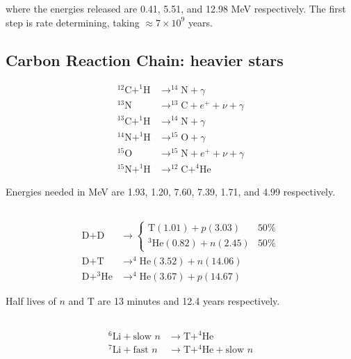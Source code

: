 \documentclass[12pt]{article}
\begin{document}
where the energies released are 0.41, 5.51, and 12.98 MeV respectively. The first step is rate determining, taking $\approx 7 \times 10^9$ years.

\subsection{Carbon Reaction Chain: heavier stars}

\begin{align*}
    ^{12}\text{C} + ^1\text{H} &\rightarrow ^{14}\text{N} + \gamma \\
    ^{13}\text{N} &\rightarrow ^{13}\text{C} + e^+ + \nu + \gamma \\
    ^{13}\text{C} + ^1\text{H} &\rightarrow ^{14}\text{N} + \gamma \\
    ^{14}\text{N} + ^1\text{H} &\rightarrow ^{15}\text{O} + \gamma \\
    ^{15}\text{O} &\rightarrow ^{15}\text{N} + e^+ + \nu + \gamma \\
    ^{15}\text{N} + ^1\text{H} &\rightarrow ^{12}\text{C} + ^4\text{He}
\end{align*}

Energies needed in MeV are 1.93, 1.20, 7.60, 7.39, 1.71, and 4.99 respectively.

\subsection{}

\begin{align*}
    \text{D} + \text{D} &\rightarrow \begin{cases} \text{T} (1.01) + p (3.03) & 50\% \\ ^3\text{He} (0.82) + n (2.45) & 50\% \end{cases} \\
    \text{D} + \text{T} &\rightarrow ^4\text{He} (3.52) + n (14.06) \\
    \text{D} + ^3\text{He} &\rightarrow ^4\text{He} (3.67) + p (14.67)
\end{align*}

Half lives of $n$ and T are 13 minutes and 12.4 years respectively.

\subsection{}

\begin{align*}
    ^6\text{Li} + \text{slow } n &\rightarrow \text{T} + ^4\text{He} \\
    ^7\text{Li} + \text{fast } n &\rightarrow \text{T} + ^4\text{He} + \text{slow } n
\end{align*}
\end{document}
